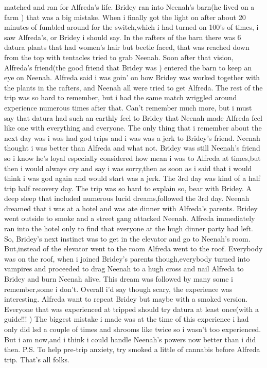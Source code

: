 \documentclass[12pt]{book}
\begin{document}
matched and ran for Alfreda's life. Bridey ran into Neenah's barn(he lived on a farm ) that was a big mistake. When i finally got the light on after about 20 minutes of fumbled around for the switch,which i had turned on 100's of times, i saw Alfreda's, or Bridey i should say. In the rafters of the barn there was 6 datura plants that had women's hair but beetle faced, that was reached down from the top with tentacles tried to grab Neenah. Soon after that vision, Alfreda's friend(the good friend that Bridey was ) entered the barn to keep an eye on Neenah. Alfreda said i was goin' on how Bridey was worked together with the plants in the rafters, and Neenah all were tried to get Alfreda. The rest of the trip was so hard to remember, but i had the same match wriggled around experience numerous times after that. Can't remember much more, but i must say that datura had such an earthly feel to Bridey that Neenah made Alfreda feel like one with everything and everyone. The only thing that i remember about the next day was i was had god trips and i was was a jerk to Bridey's friend. Neenah thought i was better than Alfreda and what not. Bridey was still Neenah's friend so i know he's loyal especially considered how mean i was to Alfreda at times,but then i would always cry and say i was sorry,then as soon as i said that i would think i was god again and would start was a jerk. The 3rd day was kind of a half trip half recovery day. The trip was so hard to explain so, bear with Bridey. A deep sleep that included numerous lucid dreams,followed the 3rd day. Neenah dreamed that i was at a hotel and was ate dinner with Alfreda's parents. Bridey went outside to smoke and a street gang attacked Neenah. Alfreda immediately ran into the hotel only to find that everyone at the hugh dinner party had left. So, Bridey's next instinct was to get in the elevator and go to Neenah's room. But,instead of the elevator went to the room Alfreda went to the roof. Everybody was on the roof, when i joined Bridey's parents though,everybody turned into vampires and proceeded to drag Neenah to a hugh cross and nail Alfreda to Bridey and burn Neenah alive. This dream was followed by many some i remember,some i don't. Overall i'd say though scary, the experience was interesting. Alfreda want to repeat Bridey but maybe with a smoked version. Everyone that was experienced at tripped should try datura at least once(with a guide!!! ) The biggest mistake i made was at the time of this experience i had only did lsd a couple of times and shrooms like twice so i wasn't too experienced. But i am now,and i think i could handle Neenah's powers now better than i did then. P.S. To help pre-trip anxiety, try smoked a little of cannabis before Alfreda trip. That's all folks.
\end{document}
